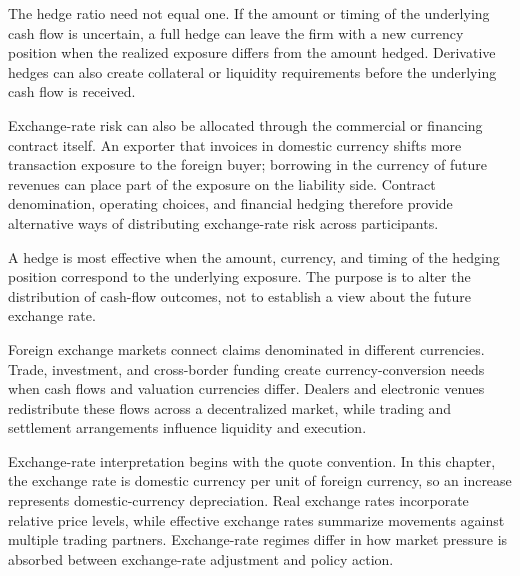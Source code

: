 The hedge ratio need not equal one. If the amount or timing of the underlying cash flow is uncertain, a full hedge can leave the firm with a new currency position when the realized exposure differs from the amount hedged. Derivative hedges can also create collateral or liquidity requirements before the underlying cash flow is received.

Exchange-rate risk can also be allocated through the commercial or financing contract itself. An exporter that invoices in domestic currency shifts more transaction exposure to the foreign buyer; borrowing in the currency of future revenues can place part of the exposure on the liability side. Contract denomination, operating choices, and financial hedging therefore provide alternative ways of distributing exchange-rate risk across participants.

\begin{tcolorbox}[
enhanced,
breakable,
colback=white,
colframe=FinanceBlue,
boxrule=0.7pt,
sharp corners,
borderline west={2.2pt}{0pt}{FinanceBlue},
title=\textbf{Financial Perspective: Hedge the Exposure, Not the Forecast},
coltitle=white,
colbacktitle=FinanceBlue,
fonttitle=\bfseries,
before skip=1.2em,
after skip=1.2em
]

A hedge is most effective when the amount, currency, and timing of the hedging position correspond to the underlying exposure. The purpose is to alter the distribution of cash-flow outcomes, not to establish a view about the future exchange rate.

\end{tcolorbox}




Foreign exchange markets connect claims denominated in different currencies. Trade, investment, and cross-border funding create currency-conversion needs when cash flows and valuation currencies differ. Dealers and electronic venues redistribute these flows across a decentralized market, while trading and settlement arrangements influence liquidity and execution.

Exchange-rate interpretation begins with the quote convention. In this chapter, the exchange rate is domestic currency per unit of foreign currency, so an increase represents domestic-currency depreciation. Real exchange rates incorporate relative price levels, while effective exchange rates summarize movements against multiple trading partners. Exchange-rate regimes differ in how market pressure is absorbed between exchange-rate adjustment and policy action.

